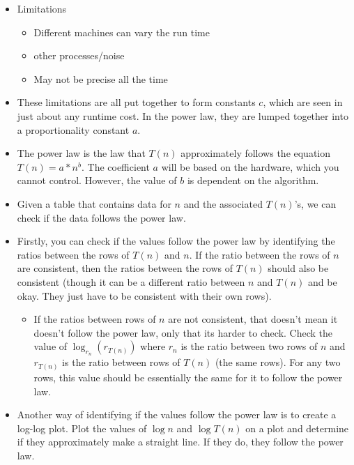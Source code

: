 \documentclass{article}
\begin{document}
\begin{itemize}
    \item Limitations
        \begin{itemize}
            \item Different machines can vary the run time 
            \item other processes/noise
            \item May not be precise all the time 
        \end{itemize}
    \item These limitations are all put together to form constants $c$, which are seen in just about any runtime cost. In the power law, they are lumped together into a proportionality constant $a$.
    \item The power law is the law that $T(n)$ approximately follows the equation $T(n) = a * n^b$. The coefficient $a$ will be based on the hardware, which you cannot control. However, the value of $b$ is dependent on the algorithm.
    \item Given a table that contains data for $n$ and the associated $T(n)$'s, we can check if the data  follows the power law.
    \item Firstly, you can check if the values follow the power law by identifying the ratios between the rows of $T(n)$ and $n$. If the ratio between the rows of $n$ are consistent, then the ratios between the rows of $T(n)$ should also be consistent (though it can be a different ratio between $n$ and $T(n)$ and be okay. They just have to be consistent with their own rows).
        \begin{itemize}
            \item If the ratios between rows of $n$ are not consistent, that doesn't mean it doesn't follow the power law, only that its harder to check. Check the value of $\log_{r_n} (r_{T(n)})$ where $r_n$ is the ratio between two rows of $n$ and $r_{T(n)}$ is the ratio between rows of $T(n)$ (the same rows). For any two rows, this value should be essentially the same for it to follow the power law.
        \end{itemize}
    \item
        Another way of identifying if the values follow the power law is to create a log-log plot. Plot the values of $\log n$ and $\log T(n)$ on a plot and determine if they approximately make a straight line. If they do, they follow the power law.


\end{itemize}
\end{document}
